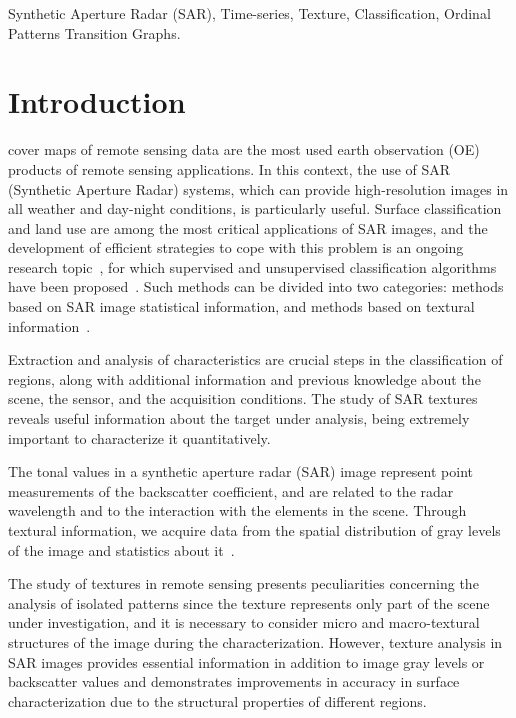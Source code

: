 \documentclass[journal]{IEEEtran}
\begin{document}
\begin{IEEEkeywords}
Synthetic Aperture Radar (SAR), 
Time-series, 
Texture, 
Classification, 
Ordinal Patterns Transition Graphs.
\end{IEEEkeywords}

\IEEEpeerreviewmaketitle

\section{Introduction}

 cover maps of remote sensing data are the most used earth observation (OE) products of remote sensing applications. 
In this context, the use of SAR (Synthetic Aperture Radar) systems, which can provide high-resolution images in all weather and day-night conditions, is particularly useful.
Surface classification and land use are among the most critical applications of SAR images, and the development of efficient strategies to cope with this problem is an ongoing research topic~\cite{Pottier2004Unsupervised}, for which supervised and unsupervised classification algorithms have been proposed~\cite{han2020unsupervised,huang2020classification,xie2020polsar}.
Such methods can be divided into two categories: methods based on SAR image statistical information, and methods based on textural information~\cite{guan2019covariance}.

Extraction and analysis of characteristics are crucial steps in the classification of regions, along with additional information and previous knowledge about the scene, the sensor, and the acquisition conditions.
The study of SAR textures reveals useful information about the target under analysis, being extremely important to characterize it quantitatively.

The tonal values in a synthetic aperture radar (SAR) image represent point measurements of the backscatter coefficient, and are related to the radar wavelength and to the interaction with the elements in the scene.
Through textural information, we acquire data from the spatial distribution of gray levels of the image and statistics about it~\cite{AGeneralizedGaussianCoherentScattererModelforCorrelatedSARTexture}.

The study of textures in remote sensing presents peculiarities concerning the analysis of isolated patterns since the texture represents only part of the scene under investigation, and it is necessary to consider micro and macro-textural structures of the image during the characterization.
However, texture analysis in SAR images provides essential information in addition to image gray levels or backscatter values and demonstrates improvements in accuracy in surface characterization due to the structural properties of different regions.
 
\end{document}
